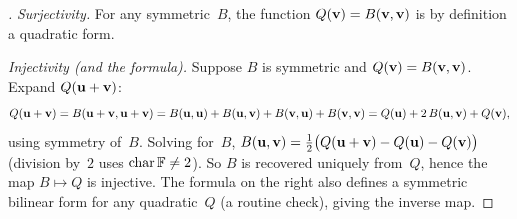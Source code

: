 \begin{proof}[]
\emph{Surjectivity.} For any symmetric~$B$, the function
$Q(\mathbf{v}) = B(\mathbf{v}, \mathbf{v})$ is by definition a quadratic
form.

\emph{Injectivity (and the formula).} Suppose $B$ is symmetric and
$Q(\mathbf{v}) = B(\mathbf{v}, \mathbf{v})$. Expand $Q(\mathbf{u} + \mathbf{v})$:
\[
  Q(\mathbf{u} + \mathbf{v}) = B(\mathbf{u} + \mathbf{v}, \mathbf{u} + \mathbf{v})
  = B(\mathbf{u}, \mathbf{u}) + B(\mathbf{u}, \mathbf{v}) + B(\mathbf{v}, \mathbf{u}) + B(\mathbf{v}, \mathbf{v})
  = Q(\mathbf{u}) + 2\,B(\mathbf{u}, \mathbf{v}) + Q(\mathbf{v}),
\]
using symmetry of~$B$. Solving for~$B$,
$B(\mathbf{u}, \mathbf{v}) = \tfrac{1}{2}\bigl(Q(\mathbf{u} + \mathbf{v}) - Q(\mathbf{u}) - Q(\mathbf{v})\bigr)$
(division by~$2$ uses $\operatorname{char} \mathbb{F} \neq 2$). So $B$ is
recovered uniquely from~$Q$, hence the map $B \mapsto Q$ is injective.
The formula on the right also defines a symmetric bilinear form for
any quadratic~$Q$ (a routine check), giving the inverse map.
\end{proof}

